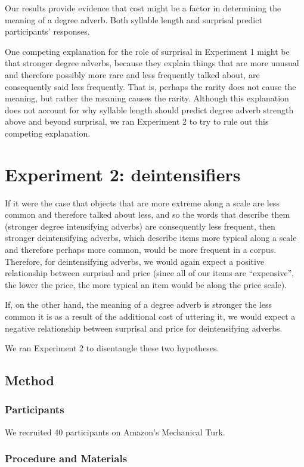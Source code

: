 \documentclass[10pt,letterpaper]{article}
\begin{document}
  Our results provide evidence that cost might be a factor in determining the meaning of a degree adverb. Both syllable length and surprisal predict participants' responses.
  
  One competing explanation for the role of surprisal in Experiment 1 might be that stronger degree adverbs, because they explain things that are more unusual and therefore possibly more rare and less frequently talked about, are consequently said less frequently. That is, perhaps the rarity does not cause the meaning, but rather the meaning causes the rarity. Although this explanation does not account for why syllable length should predict degree adverb strength above and beyond surprisal, we ran Experiment 2 to try to rule out this competing explanation. 
  
\section{Experiment 2: deintensifiers}

  If it were the case that objects that are more extreme along a scale are less common and therefore talked about less, and so the words that describe them (stronger degree intensifying adverbs) are consequently less frequent, then stronger deintensifying adverbs, which describe items more typical along a scale and therefore perhaps more common, would be more frequent in a corpus. Therefore, for deintensifying adverbs, we would again expect a positive relationship between surprisal and price (since all of our items are ``expensive'', the lower the price, the more typical an item would be along the price scale).
  
  If, on the other hand, the meaning of a degree adverb is stronger the less common it is as a result of the additional cost of uttering it, we would expect a negative relationship between surprisal and price for deintensifying adverbs.
  
  We ran Experiment 2 to disentangle these two hypotheses.

  \subsection{Method}
    \subsubsection{Participants}
    We recruited 40 participants on Amazon's Mechanical Turk.
    \subsubsection{Procedure and Materials}
      
\end{document}
